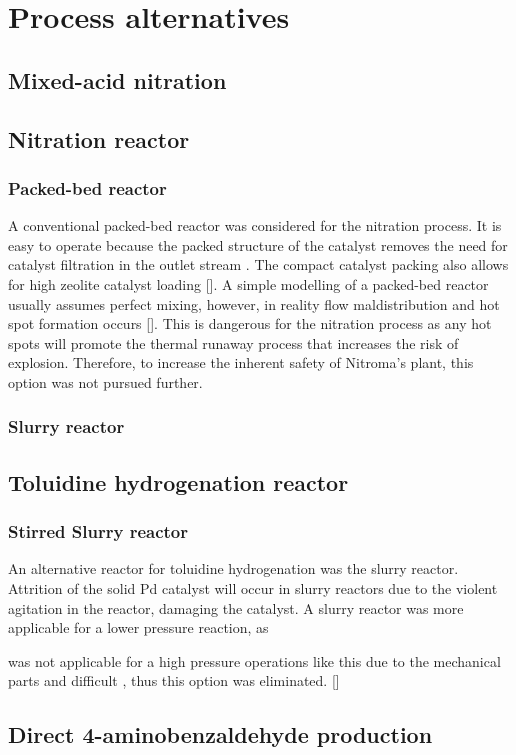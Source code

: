 \section{Process alternatives}
\label{app:alternatives}

\subsection{Mixed-acid nitration}
\label{mixed}

\subsection{Nitration reactor}
\label{nitrationreactor}
\subsubsection{Packed-bed reactor}
A conventional packed-bed reactor was considered for the nitration process. It is easy to operate because the packed structure of the catalyst removes the need for catalyst filtration in the outlet stream . The compact catalyst packing also allows for high zeolite catalyst loading []. A simple modelling of a packed-bed reactor usually assumes perfect mixing, however, in reality flow maldistribution and hot spot formation occurs []. This is dangerous for the nitration process as any hot spots will promote the thermal runaway process that increases the risk of explosion. Therefore, to increase the inherent safety of Nitroma's plant, this option was not pursued further.

\subsubsection{Slurry reactor}

\subsection{Toluidine hydrogenation reactor}
\label{toluidine}
\subsubsection{Stirred Slurry reactor}
An alternative reactor for toluidine hydrogenation was the slurry reactor. Attrition of the solid Pd catalyst will occur in slurry reactors due to the violent agitation in the reactor, damaging the catalyst. A slurry reactor was more applicable for a lower pressure reaction, as 

was not applicable for a high pressure operations like this due to the mechanical parts and difficult
, thus this option was eliminated. []


\subsection{Direct 4-aminobenzaldehyde production}
\label{direct}